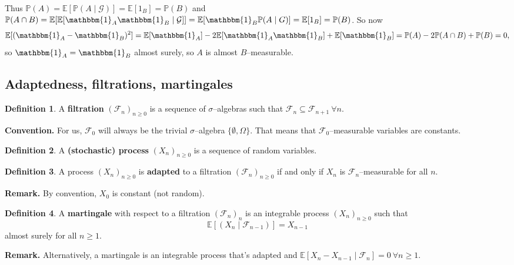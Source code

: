 \documentclass{article}
\theoremstyle{definition}
\newtheorem{defn}{Definition}[section]
\begin{document}
Thus $\mathbb{P}(A)= \mathbb{E}[\mathbb{P}(A \mid \mathcal{G})] = \mathbb{E}[1_B]=\mathbb{P}(B)$ and $\mathbb{P}(A \cap B) = \mathbb{E}[\mathbb{E}[\mathbbm{1}_A \mathbbm{1}_B \mid \mathcal{G}]] = \mathbb{E}[\mathbbm{1}_B \mathbb{P}(A \mid G)] = \mathbb{E}[1_B] = \mathbb{P}(B)$. So now 
\[
\mathbb{E}[(\mathbbm{1}_A - \mathbbm{1}_B)^2] = \mathbb{E}[\mathbbm{1}_A] - 2\mathbb{E}[\mathbbm{1}_A \mathbbm{1}_B] + \mathbb{E}[\mathbbm{1}_B] = \mathbb{P}(A) - 2 \mathbb{P}(A \cap B) + \mathbb{P}(B) = 0,
\]
so $\mathbbm{1}_A = \mathbbm{1}_B$ almost surely, so $A$ is almost $B$--measurable.

\subsection{Adaptedness, filtrations, martingales}

\begin{defn}
    A \textbf{filtration} $(\mathcal{F}_n)_{n\ge 0}$ is a sequence of $\sigma$--algebras such that $\mathcal{F}_n \subseteq \mathcal{F}_{n+1} ~\forall n$.
\end{defn}
\textbf{Convention.} For us, $\mathcal{F}_0$ will always be the trivial $\sigma$--algebra $\{\emptyset, \Omega\}$. That means that $\mathcal{F}_0$--measurable variables are constants.

\begin{defn}
    A \textbf{(stochastic) process} $(X_n)_{n\ge 0}$ is a sequence of random variables.
\end{defn}
\begin{defn}
    A process $(X_n)_{n\ge 0}$ is \textbf{adapted} to a filtration $(\mathcal{F}_n)_{n\ge 0}$ if and only if $X_n$ is $\mathcal{F}_n$--measurable for all $n$.
\end{defn}
\textbf{Remark.} By convention, $X_0$ is constant (not random).

\begin{defn}
    A \textbf{martingale} with respect to a filtration $(\mathcal{F}_n)_n$ is an integrable process $(X_n)_{n\ge 0}$ such that $$\mathbb{E}[(X_n \mid \mathcal{F}_{n-1})] = X_{n-1}$$ almost surely for all $n\ge 1$.
\end{defn}
\textbf{Remark.} Alternatively, a martingale is an integrable process that's adapted and $\mathbb{E}[X_n - X_{n-1} \mid \mathcal{F}_n] = 0 ~\forall n\ge 1$.
\end{document}
